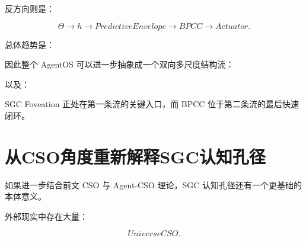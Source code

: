 \begin{statementbox}
\centering
{}
\end{statementbox}

反方向则是：

\[
\Theta
\rightarrow
h
\rightarrow
PredictiveEnvelope
\rightarrow
BPCC
\rightarrow
Actuator.
\]

总体趋势是：

\begin{statementbox}
\centering
{}
\end{statementbox}

\begin{statementbox}
\centering
{}
\end{statementbox}

\begin{statementbox}
\centering
{}
\end{statementbox}

因此整个 AgentOS 可以进一步抽象成一个双向多尺度结构流：

\begin{statementbox}
\centering
{}
\end{statementbox}

以及：

\begin{statementbox}
\centering
{}
\end{statementbox}

SGC Foveation 正处在第一条流的关键入口，而 BPCC 位于第二条流的最后快速闭环。

\section{从CSO角度重新解释SGC认知孔径}

如果进一步结合前文 CSO 与 Agent-CSO 理论，SGC 认知孔径还有一个更基础的本体意义。

外部现实中存在大量：

\[
UniverseCSO.
\]

